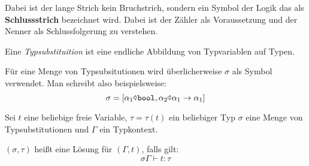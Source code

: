 Dabei ist der lange Strich kein Bruchstrich, sondern ein Symbol der Logik das als
\textbf{Schlussstrich} bezeichnet wird. Dabei ist der 
Zähler als Voraussetzung und der Nenner als Schlussfolgerung zu verstehen.

\begin{definition}[Typsubstituition]%
	Eine \textit{Typsubstituition} ist eine endliche Abbildung von Typvariablen auf
	Typen.
\end{definition}

Für eine Menge von Typsubsitutionen wird überlicherweise $\sigma$ als Symbol
verwendet. Man schreibt also beispielsweise:
\[\sigma = [\alpha_1 \text{\pointer} \text{\texttt{bool}}, \alpha_2 \text{\pointer} \alpha_1 \rightarrow \alpha_1]\]

\begin{definition}
	Sei $t$ eine beliebige freie Variable, $\tau = \tau(t)$ ein beliebiger Typ
	$\sigma$ eine Menge von Typsubstitutionen und $\Gamma$ ein Typkontext.

	$(\sigma, \tau)$ heißt eine Lösung für $(\Gamma, t)$, falls gilt:
	\[\sigma \Gamma \vdash t : \tau\]
\end{definition}